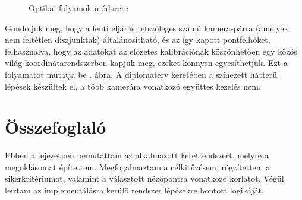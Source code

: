 \begin{sidewaysfigure}
{
}

\caption{Optikai folyamok módszere \label{fig:of-method}}
\end{sidewaysfigure}

Gondoljuk meg, hogy a fenti eljárás tetszőleges számú kamera-párra (amelyek nem feltétlen diszjunktak) általánosítható, és az így kapott pontfelhőket, felhasználva, hogy az adatokat az előzetes kalibrációnak köszönhetően egy közös világ-koordinátarendszerben kapjuk meg, ezeket könnyen egyesíthetjük. Ezt a folyamatot mutatja be . ábra. A diplomaterv keretében a színezett hátterű lépések készültek el, a több kamerára vonatkozó együttes kezelés nem.


\section{Összefoglaló}

Ebben a fejezetben bemutattam az alkalmazott keretrendszert, melyre a megoldásomat építettem. Megfogalmaztam a célkitűzésem, rögzítettem a sikerkritériumot, valamint a választott nézőpontra vonatkozó korlátot. Végül leírtam az implementálásra kerülő rendszer lépésekre bontott logikáját.